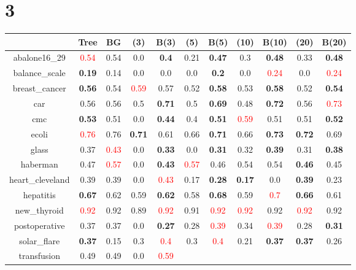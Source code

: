\documentclass{article}%
\begin{document}
\section*{3}%
\begin{tabular}{c|cccccccccc}%
\hline%
&Tree&BG&(3)&B(3)&(5)&B(5)&(10)&B(10)&(20)&B(20)\\%
\hline%
abalone16\_29&\textcolor{red}{ 
0.54
}&0.54&0.0&\textbf{0.4}&0.21&\textbf{0.47}&0.3&\textbf{0.48}&0.33&\textbf{0.48}\\%
\hline%
balance\_scale&\textbf{0.19}&0.14&0.0&0.0&0.0&\textbf{0.2}&0.0&\textcolor{red}{ 
0.24
}&0.0&\textcolor{red}{ 
0.24
}\\%
\hline%
breast\_cancer&\textbf{0.56}&0.54&\textcolor{red}{ 
0.59
}&0.57&0.52&\textbf{0.58}&0.53&\textbf{0.58}&0.52&\textbf{0.54}\\%
\hline%
car&0.56&0.56&0.5&\textbf{0.71}&0.5&\textbf{0.69}&0.48&\textbf{0.72}&0.56&\textcolor{red}{ 
0.73
}\\%
\hline%
cmc&\textbf{0.53}&0.51&0.0&\textbf{0.44}&0.4&\textbf{0.51}&\textcolor{red}{ 
0.59
}&0.51&0.51&\textbf{0.52}\\%
\hline%
ecoli&\textcolor{red}{ 
0.76
}&0.76&\textbf{0.71}&0.61&0.66&\textbf{0.71}&0.66&\textbf{0.73}&\textbf{0.72}&0.69\\%
\hline%
glass&0.37&\textcolor{red}{ 
0.43
}&0.0&\textbf{0.33}&0.0&\textbf{0.31}&0.32&\textbf{0.39}&0.31&\textbf{0.38}\\%
\hline%
haberman&0.47&\textcolor{red}{ 
0.57
}&0.0&\textbf{0.43}&\textcolor{red}{ 
0.57
}&0.46&0.54&0.54&\textbf{0.46}&0.45\\%
\hline%
heart\_cleveland&0.39&0.39&0.0&\textcolor{red}{ 
0.43
}&0.17&\textbf{0.28}&\textbf{0.17}&0.0&\textbf{0.39}&0.23\\%
\hline%
hepatitis&\textbf{0.67}&0.62&0.59&\textbf{0.62}&0.58&\textbf{0.68}&0.59&\textcolor{red}{ 
0.7
}&\textbf{0.66}&0.61\\%
\hline%
new\_thyroid&\textcolor{red}{ 
0.92
}&0.92&0.89&\textcolor{red}{ 
0.92
}&0.91&\textcolor{red}{ 
0.92
}&\textcolor{red}{ 
0.92
}&0.92&\textcolor{red}{ 
0.92
}&0.92\\%
\hline%
postoperative&0.37&0.37&0.0&\textbf{0.27}&0.28&\textcolor{red}{ 
0.39
}&0.34&\textcolor{red}{ 
0.39
}&0.28&\textbf{0.31}\\%
\hline%
solar\_flare&\textbf{0.37}&0.15&0.3&\textcolor{red}{ 
0.4
}&0.3&\textcolor{red}{ 
0.4
}&0.21&\textbf{0.37}&\textbf{0.37}&0.26\\%
\hline%
transfusion&0.49&0.49&0.0&\textcolor{red}{ 
0.59
}
\end{tabular}
\end{document}
